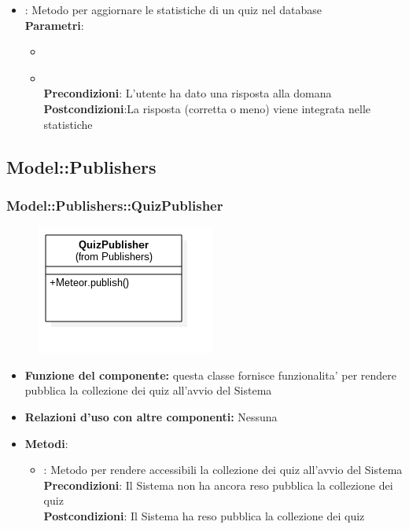 \begin{itemize}
\begin{itemize}
	\item{} : Metodo per aggiornare le statistiche di un quiz nel database\\
	\textbf{Parametri}:
	\begin{itemize}
		\item{}\\
		\item{}\\
		\textbf{Precondizioni}: L'utente ha dato una risposta alla domana\\
		\textbf{Postcondizioni}:La risposta (corretta o meno) viene integrata nelle statistiche\\
	\end{itemize}
\end{itemize}
\end{itemize}
\newpage

\subsection{Model::Publishers}
\subsubsection{Model::Publishers::QuizPublisher}
\begin{figure}[h!]
\begin{center}
	\includegraphics[scale=0.6]{../images/Model/Publishers/QuizPublisher.png}
\end{center}
\end{figure}
\begin{itemize}
\item\textbf{Funzione del componente:} questa classe fornisce funzionalita' per rendere pubblica la collezione dei quiz all'avvio del Sistema
\item\textbf{Relazioni d'uso con altre componenti:} Nessuna \\
\item\textbf{Metodi}:
	\begin{itemize}
		\item{} : Metodo per rendere accessibili la collezione dei quiz all'avvio del Sistema\\
		\textbf{Precondizioni}: Il Sistema non ha ancora reso pubblica la collezione dei quiz\\
		\textbf{Postcondizioni}: Il Sistema ha reso pubblica la collezione dei quiz\\
	\end{itemize}
\end{itemize}
\newpage

